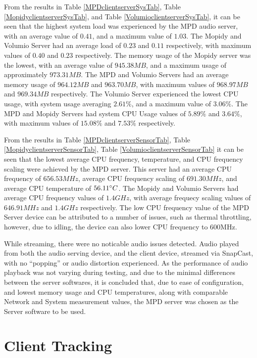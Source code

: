 \documentclass[11pt,a4paper]{scrreprt}
\begin{document}
From the results in Table \ref{MPDclientserverSysTab}, Table
\ref{MopidyclientserverSysTab}, and Table
\ref{VolumioclientserverSysTab}, it can be seen that the highest system
load was experienced by the MPD audio server, with an average value of
\(0.41\), and a maximum value of \(1.03\). The Mopidy and Volumio Server
had an average load of \(0.23\) and \(0.11\) respectively, with maximum
values of \(0.40\) and \(0.23\) respectively. The memory usage of the
Mopidy server was the lowest, with an average value of \(945.38MB\), and
a maximum usage of approximately \(973.31MB\). The MPD and Volumio
Servers had an average memory usage of \(964.12MB\) and \(963.70MB\),
with maximum values of \(968.97MB\) and \(969.34MB\) respectively. The
Volumio Server experienced the lowest CPU usage, with system usage
averaging \(2.61\%\), and a maximum value of \(3.06\%\). The MPD and
Mopidy Servers had system CPU Usage values of \(5.89\%\) and \(3.64\%\),
with maximum values of \(15.08\%\) and \(7.53\%\) respectively.

From the results in Table \ref{MPDclientserverSensorTab}, Table
\ref{MopidyclientserverSensorTab}, Table
\ref{VolumioclientserverSensorTab} it can be seen that the lowest
average CPU frequency, temperature, and CPU frequency scaling were
achieved by the MPD server. This server had an average CPU frequency of
\(656.53MHz\), average CPU frequency scaling of \(691.30MHz\), and
average CPU temperature of \(56.11 \degree C\). The Mopidy and Volumio
Servers had average CPU frequency values of \(1.4GHz\), with average
frequecy scaling values of \(646.91MHz\) and \(1.4GHz\) respectively.
The low CPU frequency value of the MPD Server device can be attributed
to a number of issues, such as thermal throttling, however, due to
idling, the device can also lower CPU frequency to 600MHz\cite{RPiFreq}.

While streaming, there were no noticable audio issues detected. Audio
played from both the audio serving device, and the client device,
streamed via SnapCast, with no ``popping'' or audio distortion
experienced. As the performance of audio playback was not varying during
testing, and due to the minimal differences between the server
softwares, it is concluded that, due to ease of configuration, and
lowest memory usage and CPU temperatures, along with comparable Network
and System measurement values, the MPD server was chosen as the Server
software to be used.

\section{Client Tracking}\label{client-tracking-1}
\end{document}
